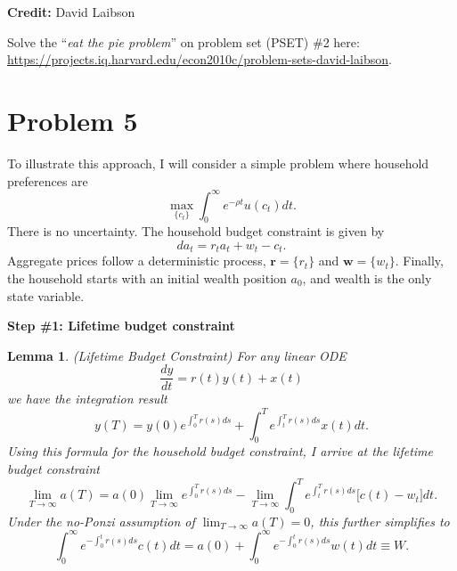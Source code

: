\documentclass[11pt]{extarticle}
\theoremstyle{plain}
\newtheorem{lem}[thm]{Lemma}
\theoremstyle{definition}
\begin{document}
\textbf{Credit:} David Laibson

\vspace{5mm}
\noindent
Solve the ``\textit{eat the pie problem}'' on problem set (PSET) \#2 here: \url{https://projects.iq.harvard.edu/econ2010c/problem-sets-david-laibson}.





\vspace{10mm}
\section*{Problem 5}


To illustrate this approach, I will consider a simple problem where household preferences are 
\begin{equation*}
	\max_{\{c_t\}} \int_0^\infty e^{- \rho t} u(c_t) dt. 
\end{equation*}
There is no uncertainty. The household budget constraint is given by
\begin{equation*}
	da_t = r_t a_t + w_t - c_t. 
\end{equation*}
Aggregate prices follow a deterministic process, $\bm{r} = \{r_t\}$ and $\bm{w} = \{w_t\}$. Finally, the household starts with an initial wealth position $a_0$, and wealth is the only state variable. 




\vspace{5mm}
\noindent
\textbf{Step \#1: Lifetime budget constraint}

\vspace{3mm}
\noindent
\begin{lem} (Lifetime Budget Constraint) For any linear ODE 
	\begin{equation*}
		\frac{dy}{dt} = r(t) y(t) + x(t)
	\end{equation*}
	we have the integration result 
	\begin{equation*}
		y(T)  = y(0) e^{\int_0^T r(s) ds} +  \int_0^T e^{\int_t^T r(s) ds }  x(t) dt.
	\end{equation*}
	Using this formula for the household budget constraint, I arrive at the lifetime budget constraint 
	\begin{equation*}
		\lim_{T \to \infty} a(T)  = a(0) \lim_{T \to \infty} e^{\int_0^T r(s) ds} -  \lim_{T \to \infty} \int_0^T e^{\int_t^T r(s) ds } \Big[ c(t) - w_t \Big] dt.
	\end{equation*}
	Under the no-Ponzi assumption of $\lim_{T \to \infty} a(T) = 0$, this further simplifies to 
	\begin{equation*}
		\int_0^\infty e^{- \int_0^t r(s) ds }   c(t) dt = a(0) + \int_0^\infty e^{- \int_0^t r(s) ds }   w(t) dt \equiv W.
	\end{equation*}
\end{lem}
\end{document}
